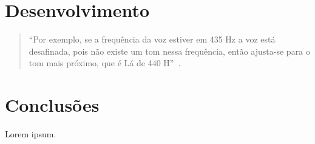 \documentclass{sbrt}
\begin{document}

\section{Desenvolvimento}

\begin{quote}
  ``Por exemplo, se a frequência da voz estiver em 435 Hz a voz está desafinada, pois não existe um tom nessa
  frequência, então ajusta-se para o tom mais próximo, que é Lá de 440 H''~\cite{deimplementaccao}.
\end{quote}


\section{Conclusões}

Lorem ipsum.





\end{document}
